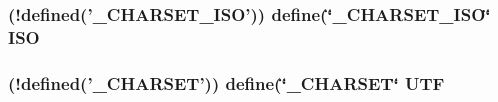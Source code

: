 \hypertarget{admin_2index_8php_a925a4f82eb4a8af51868be3473dd6cb3}{
\subsubsection[{I\-S\-O}]{ (!defined('\-\_\-\-C\-H\-A\-R\-S\-E\-T\-\_\-\-I\-S\-O')) define(\char`\"{}\-\_\-\-C\-H\-A\-R\-S\-E\-T\-\_\-\-I\-S\-O\char`\"{} I\-S\-O}}\label{admin_2index_8php_a925a4f82eb4a8af51868be3473dd6cb3}
\hypertarget{admin_2index_8php_a68a3115a9d21b3451b1b631ea0aa45a8}{
\subsubsection[{U\-T\-F}]{ (!defined('\-\_\-\-C\-H\-A\-R\-S\-E\-T')) define(\char`\"{}\-\_\-\-C\-H\-A\-R\-S\-E\-T\char`\"{} U\-T\-F}}\label{admin_2index_8php_a68a3115a9d21b3451b1b631ea0aa45a8}
